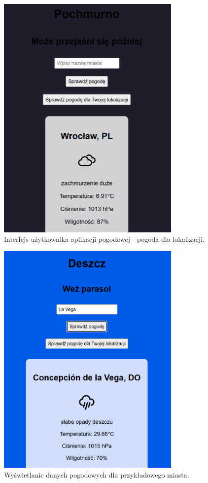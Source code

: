 \documentclass[11pt, a4paper]{article}
\begin{document}
\begin{figure}[H]
    \centering
    \includegraphics[width=0.8\textwidth]{weather-location.png}
    \caption{Interfejs użytkownika aplikacji pogodowej - pogoda dla lokalizacji.}
    \label{fig:pogoda_ui}
\end{figure}

\begin{figure}[H]
    \centering
    \includegraphics[width=0.8\textwidth]{weather-city.png}
    \caption{Wyświetlanie danych pogodowych dla przykładowego miasta.}
    \label{fig:pogoda_wynik}
\end{figure}
\end{document}
